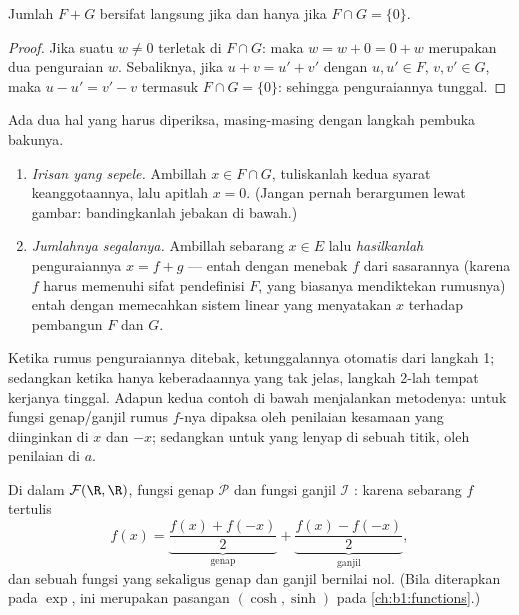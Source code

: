 \begin{proposition}\label{prop:b1:vspaces:directsum}
Jumlah $F + G$ bersifat langsung jika dan hanya jika $F \cap G = \{0\}$.
\end{proposition}

\begin{proof}
Jika suatu $w \neq 0$ terletak di $F \cap G$: maka $w = w + 0 = 0 + w$ merupakan dua
penguraian $w$. Sebaliknya, jika $u + v = u' + v'$ dengan $u, u'
\in F$, $v, v' \in G$, maka $u - u' = v' - v$ termasuk $F \cap G =
\{0\}$: sehingga penguraiannya tunggal.
\end{proof}

\begin{method}[Membuktikan $E = F \oplus G$]
\label{met:b1:vspaces:directsum}
Ada dua hal yang harus diperiksa, masing-masing dengan langkah pembuka bakunya.
\begin{enumerate}
  \item \emph{Irisan yang sepele.} Ambillah $x \in F \cap G$,
        tuliskanlah kedua syarat keanggotaannya, lalu apitlah $x =
        0$. (Jangan pernah berargumen lewat gambar: bandingkanlah jebakan di bawah.)
  \item \emph{Jumlahnya segalanya.} Ambillah sebarang $x \in E$
        lalu \emph{hasilkanlah} penguraiannya $x = f + g$ ---
        entah dengan menebak $f$ dari sasarannya (karena $f$ harus memenuhi
        sifat pendefinisi $F$, yang biasanya mendiktekan
        rumusnya) entah dengan memecahkan sistem linear yang menyatakan $x$
        terhadap pembangun $F$ dan $G$.
\end{enumerate}
Ketika rumus penguraiannya ditebak, ketunggalannya
otomatis dari langkah 1; sedangkan ketika hanya keberadaannya yang tak jelas, langkah 2-lah
tempat kerjanya tinggal. Adapun kedua contoh di bawah menjalankan metodenya: untuk
fungsi genap/ganjil rumus $f$-nya dipaksa oleh penilaian kesamaan yang
diinginkan di $x$ dan $-x$; sedangkan untuk  yang lenyap
di sebuah titik, oleh penilaian di $a$.
\end{method}

\begin{example}\label{ex:b1:vspaces:evenodd}
Di dalam $\mathcal{F}(\R, \R)$, fungsi genap $\mathcal{P}$ dan
fungsi ganjil $\mathcal{I}$ : karena sebarang $f$ tertulis
\[
f(x) = \underbrace{\frac{f(x) + f(-x)}{2}}_{\text{genap}}
+ \underbrace{\frac{f(x) - f(-x)}{2}}_{\text{ganjil}},
\]
dan sebuah fungsi yang sekaligus genap dan ganjil bernilai nol. (Bila diterapkan pada $\exp$, ini
merupakan pasangan $(\cosh, \sinh)$ pada \cref{ch:b1:functions}.)
\end{example}

